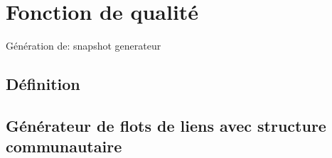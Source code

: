 \chapter{Fonction de qualité}
\minitoc


Génération de: \cite{Granell2015, Karsai2014,Perra2012} snapshot
generateur \cite{Starnini2013,Vestergaard2014}
\section{Définition}
\section{Générateur de flots de liens avec structure communautaire}